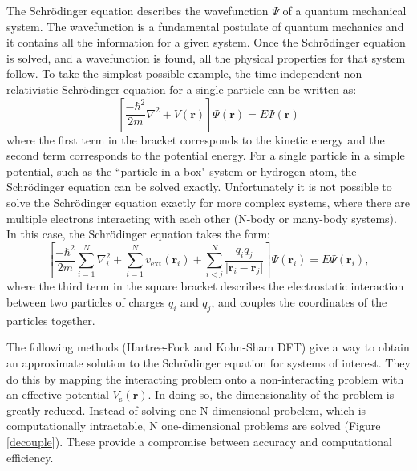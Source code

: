 The Schr\"{o}dinger equation describes the wavefunction $\Psi$ of a quantum mechanical system. The wavefunction is a fundamental postulate of quantum mechanics and it contains all the information for a given system. Once the Schr\"{o}dinger equation is solved, and a wavefunction is found, all the physical properties for that system follow. To take the simplest possible example, the time-independent non-relativistic Schr\"{o}dinger equation for a single particle can be written as:
\begin{equation}
\left[\frac{-\hbar^2}{2m}\nabla^2+V(\textbf{r})\right]\Psi(\textbf{r}) = E\Psi(\textbf{r})
\end{equation}
where the first term in the bracket corresponds to the kinetic energy and the second term corresponds to the potential energy. For a single particle in a simple potential, such as the ``particle in a box" system or hydrogen atom, the Schr\"{o}dinger equation can be solved exactly. Unfortunately it is not possible to solve the Schr\"{o}dinger equation exactly for more complex systems, where there are multiple electrons interacting with each other (N-body or many-body systems). In this case, the Schr\"{o}dinger equation takes the form:
\begin{equation}
\left[\frac{-\hbar^2}{2m}\sum_{i=1}^N\nabla_i^2+\sum_{i=1}^Nv_{\textrm{ext}}(\textbf{r}_i)+\sum_{i<j}^N\frac{q_iq_j}{\lvert\textbf{r}_i-\textbf{r}_j\rvert}\right]\Psi(\textbf{r}_i) = E\Psi(\textbf{r}_i),
\end{equation}
where the third term in the square bracket describes the electrostatic interaction between two particles of charges $q_i$ and $q_j$, and couples the coordinates of the particles together.

The following methods (Hartree-Fock and Kohn-Sham DFT) give a way to obtain an approximate solution to the Schr\"{o}dinger equation for systems of interest. They do this by mapping the interacting problem onto a non-interacting problem with an effective potential $V_\textrm{s}(\textbf{r})$. In doing so, the dimensionality of the problem is greatly reduced. Instead of solving one N-dimensional probelem, which is computationally intractable, N one-dimensional problems are solved (Figure \ref{decouple}). These provide a compromise between accuracy and computational efficiency.

